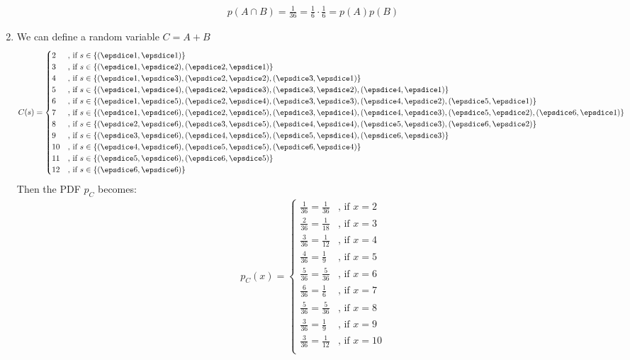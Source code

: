 \begin{enumerate}[label=\alph*.]
\begin{align*}
p(A \cap B) = \frac{1}{36} = \frac{1}{6} \cdot \frac{1}{6} = p(A) p(B)
\end{align*}
\item
We can define a random variable $C = A + B$
\begin{align*}
C(s) =
\begin{cases}
2 &\text{, if } s \in \{ (\dA, \dA) \} \\
3 &\text{, if } s \in \{ (\dA, \dB), (\dB,\dA) \} \\
4 &\text{, if } s \in \{ (\dA, \dC), (\dB,\dB), (\dC,\dA) \} \\
5 &\text{, if } s \in \{ (\dA, \dD), (\dB,\dC), (\dC,\dB), (\dD,\dA) \} \\
6 &\text{, if } s \in \{ (\dA, \dE), (\dB,\dD), (\dC,\dC), (\dD,\dB), (\dE,\dA) \} \\
7 &\text{, if } s \in \{ (\dA, \dF), (\dB,\dE), (\dC,\dD), (\dD,\dC), (\dE,\dB), (\dF,\dA) \} \\
8 &\text{, if } s \in \{ (\dB, \dF), (\dC,\dE), (\dD,\dD), (\dE,\dC), (\dF,\dB) \} \\
9 &\text{, if } s \in \{ (\dC, \dF), (\dD,\dE), (\dE,\dD), (\dF,\dC) \} \\
10 &\text{, if } s \in \{ (\dD, \dF), (\dE,\dE), (\dF,\dD) \} \\
11 &\text{, if } s \in \{ (\dE, \dF), (\dF,\dE) \} \\
12 &\text{, if } s \in \{ (\dF, \dF) \} \\
\end{cases}
\end{align*}
Then the PDF $p_C$ becomes:
\begin{align*}
p_C(x) = \begin{cases}
\frac{1}{36} = \frac{1}{36} &\text{, if } x = 2\\
\frac{2}{36} = \frac{1}{18} &\text{, if } x = 3\\
\frac{3}{36} = \frac{1}{12} &\text{, if } x = 4\\
\frac{4}{36} = \frac{1}{9}  &\text{, if } x = 5\\
\frac{5}{36} = \frac{5}{36} &\text{, if } x = 6\\
\frac{6}{36} = \frac{1}{6}  &\text{, if } x = 7\\
\frac{5}{36} = \frac{5}{36} &\text{, if } x = 8\\
\frac{3}{36} = \frac{1}{9}  &\text{, if } x = 9\\
\frac{3}{36} = \frac{1}{12} &\text{, if } x = 10\\

\end{cases}
\end{align*}
\end{enumerate}
